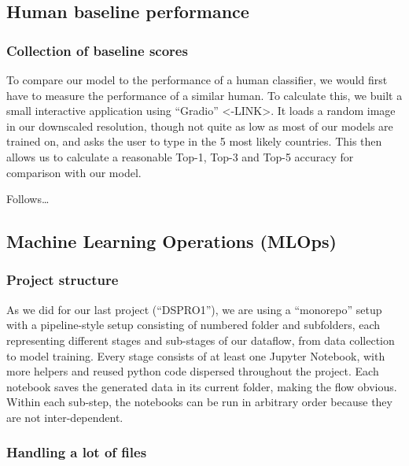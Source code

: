 \documentclass{article}
\begin{document}
\subsection{Human baseline
performance}\label{human-baseline-performance}

\subsubsection{Collection of baseline
scores}\label{collection-of-baseline-scores}

To compare our model to the performance of a human classifier, we would
first have to measure the performance of a similar human. To calculate
this, we built a small interactive application using ``Gradio''
\textless-LINK\textgreater. It loads a random image in our downscaled
resolution, though not quite as low as most of our models are trained
on, and asks the user to type in the 5 most likely countries. This then
allows us to calculate a reasonable Top-1, Top-3 and Top-5 accuracy for
comparison with our model.

Follows\ldots{}

\subsection{Machine Learning Operations
(MLOps)}\label{machine-learning-operations-mlops}

\subsubsection{Project structure}\label{project-structure}

As we did for our last project (``DSPRO1''), we are using a ``monorepo''
setup with a pipeline-style setup consisting of numbered folder and
subfolders, each representing different stages and sub-stages of our
dataflow, from data collection to model training. Every stage consists
of at least one Jupyter Notebook, with more helpers and reused python
code dispersed throughout the project. Each notebook saves the generated
data in its current folder, making the flow obvious. Within each
sub-step, the notebooks can be run in arbitrary order because they are
not inter-dependent.

\subsubsection{Handling a lot of files}\label{handling-a-lot-of-files}
\end{document}
